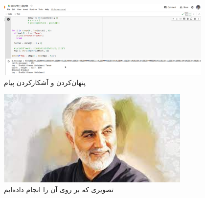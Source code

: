 \begin{boxE}
    \lr{}
\end{boxE}

\begin{figure}[h]
    \centering
    \includegraphics[width=0.95\textwidth ]{security_images/hideandunhide.png}
    \caption{
    پنهان‌کردن و آشکارکردن پیام
    }
    \label{fig:my_label}
\end{figure}

\begin{figure}[h]
    \centering
    \includegraphics[width=0.85\textwidth]{security_images/shahid_soleimani.jpeg}
    \caption{تصویری که بر روی آن 
    را انجام داده‌ایم
    }
    \label{fig:my_label}
\end{figure}